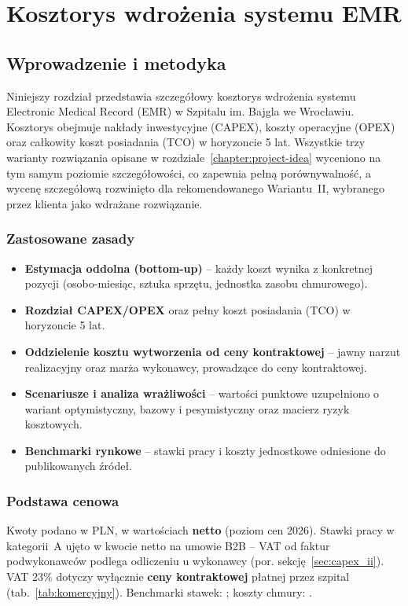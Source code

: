 \chapter{Kosztorys wdrożenia systemu EMR}
\label{chapter:costs}

\section{Wprowadzenie i metodyka}

Niniejszy rozdział przedstawia szczegółowy kosztorys wdrożenia systemu Electronic Medical Record (EMR) w Szpitalu im. Bajgla we Wrocławiu. Kosztorys obejmuje nakłady inwestycyjne (CAPEX), koszty operacyjne (OPEX) oraz całkowity koszt posiadania (TCO) w horyzoncie 5 lat. Wszystkie trzy warianty rozwiązania opisane w rozdziale~\ref{chapter:project-idea} wyceniono na tym samym poziomie szczegółowości, co zapewnia pełną porównywalność, a wycenę szczegółową rozwinięto dla rekomendowanego Wariantu~II, wybranego przez klienta jako wdrażane rozwiązanie.

\subsection{Zastosowane zasady}

\begin{itemize}
    \item \textbf{Estymacja oddolna (bottom-up)} – każdy koszt wynika z konkretnej pozycji (osobo-miesiąc, sztuka sprzętu, jednostka zasobu chmurowego).
    \item \textbf{Rozdział CAPEX/OPEX} oraz pełny koszt posiadania (TCO) w horyzoncie 5 lat.
    \item \textbf{Oddzielenie kosztu wytworzenia od ceny kontraktowej} – jawny narzut realizacyjny oraz marża wykonawcy, prowadzące do ceny kontraktowej.
    \item \textbf{Scenariusze i analiza wrażliwości} – wartości punktowe uzupełniono o wariant optymistyczny, bazowy i pesymistyczny oraz macierz ryzyk kosztowych.
    \item \textbf{Benchmarki rynkowe} – stawki pracy i koszty jednostkowe odniesione do publikowanych źródeł.
\end{itemize}

\subsection{Podstawa cenowa}

Kwoty podano w PLN, w wartościach \textbf{netto} (poziom cen 2026). Stawki pracy w kategorii~A ujęto w kwocie netto na umowie B2B -- VAT od faktur podwykonawców podlega odliczeniu u wykonawcy (por. sekcję~\ref{sec:capex_ii}). VAT 23\% dotyczy wyłącznie \textbf{ceny kontraktowej} płatnej przez szpital (tab.~\ref{tab:komercyjny}). Benchmarki stawek: \cite{Hays_2026, NoFluffJobs_2025}; koszty chmury: \cite{Azure_Pricing_2026}.

